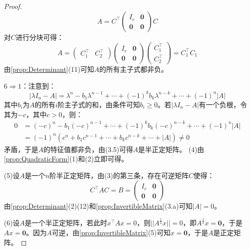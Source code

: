 \begin{proof}
	\begin{equation*}
		A=C^{\top}
		\begin{pmatrix}
			I_r & \mathbf{0} \\
			\mathbf{0} & \mathbf{0}
		\end{pmatrix}C
	\end{equation*}
	对$C$进行分块可得：
	\begin{equation*}
		A=
		\begin{pmatrix}
			C_1^{\top} & C_2^{\top}
		\end{pmatrix}
		\begin{pmatrix}
			I_r & \mathbf{0} \\
			\mathbf{0} & \mathbf{0}
		\end{pmatrix}
		\begin{pmatrix}
			C_1^{\top} \\
			C_2^{\top}
		\end{pmatrix}=C_1^{\top}C_1
	\end{equation*}
	由\cref{prop:Determinant}(11)可知$A$的所有主子式都非负。\par
	$6\Rightarrow1$：注意到：
	\begin{equation*}
		|\lambda I_n-A|=\lambda^n-b_1\lambda^{n-1}+\cdots+(-1)^kb_k\lambda^{n-k}+\cdots+(-1)^n|A|
	\end{equation*}
	其中$b_i$为$A$的所有$i$阶主子式的和，由条件可知$b_i\geqslant0$。若$|\lambda I_n-A|$有一个负根，令其为$-c$，其中$c>0$，则：
	\begin{align*}
		0&=(-c)^n-b_1(-c)^{n-1}+\cdots+(-1)^kb_k(-c)^{n-k}+\cdots+(-1)^n|A| \\
		&=(-1)^n(c^n+b_1c^{n-1}+\cdots+b_kc^{n-k}+\cdots+|A|)\ne0
	\end{align*}
	矛盾，于是$A$的特征值都非负，由(3.5)可得$A$是半正定矩阵。
	(4)由\cref{prop:QuadraticForm}(1)和(2)立即可得。\par
	(5)设$A$是一个$n$阶半正定矩阵，由(3)的第三条，存在可逆矩阵$C$使得：
	\begin{equation*}
		C^{\top}AC=B=
		\begin{pmatrix}
			I_r & \mathbf{0} \\
			\mathbf{0} & \mathbf{0}
		\end{pmatrix}
	\end{equation*}
	由\cref{prop:Determinant}(2)(12)和\cref{prop:InvertibleMatrix}(3.a)可知$|A|=0$。\par
	(6)设$A$是一个半正定矩阵，若此时$x^{\top}Ax=0$，则$||A^{\frac{1}{2}}x||=0$，即$A^{\frac{1}{2}}x=\mathbf{0}$，于是$Ax=\mathbf{0}$。因为$A$可逆，由\cref{prop:InvertibleMatrix}(5)可知$x=\mathbf{0}$，于是$A$是正定矩阵。
\end{proof}